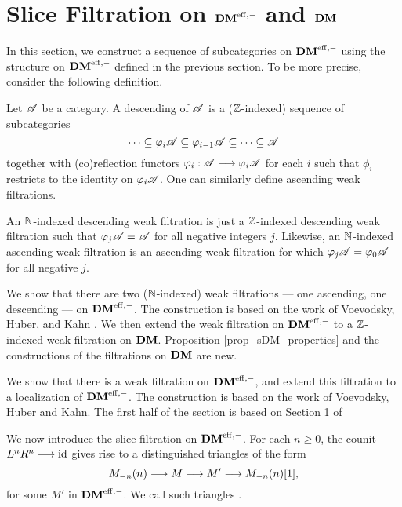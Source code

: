 \newpage
\chapter{Slice Filtration on $\DMeff$ and $\DM$}\label{sect_slice_filt_dm}

In this section, we construct a sequence of subcategories on 
$\DMeff$ using the structure on $\DMeff$ defined in the previous
section. To be more precise, consider the following definition.

\begin{defn}\label{def_cat_filtration}
Let $\Cat{A}$ be a category. A descending  of 
$\Cat{A}$ is a ($\Z$-indexed) sequence of subcategories
\[
\cdots \subseteq \phi_i\Cat{A} \subseteq \phi_{i - 1}\Cat{A} 
   \subseteq \cdots \subseteq \Cat{A}
\]
together with (co)reflection functors $\phi_i: \Cat{A} \to 
\phi_i\Cat{A}$ for each $i$ such that $\phi_i$ restricts to 
the identity on $\phi_i\Cat{A}$. One can similarly define
ascending weak filtrations.
\end{defn}

\begin{rmk}
An $\N$-indexed descending weak filtration is just a $\Z$-indexed 
descending weak filtration such that $\phi_{j}\Cat{A} = \Cat{A}$
for all negative integers $j$. Likewise, an $\N$-indexed ascending 
weak filtration is an ascending weak filtration for which
$\phi_{j}\Cat{A} = \phi_{0}\Cat{A}$ for all negative $j$.
\end{rmk}

We show that there are two ($\N$-indexed) weak filtrations --- 
one ascending, one descending --- on $\DMeff$. The construction 
is based on the work of Voevodsky, Huber, and Kahn \cite{HuKa}. 
We then extend the weak filtration on $\DMeff$ to a $\Z$-indexed
weak filtration on $\DM$. Proposition \ref{prop_sDM_properties}
and the constructions of the filtrations on $\DM$ are new.

We show that there is a weak filtration on $\DMeff$, and extend 
this filtration to a localization of $\DMeff$. The construction
is based on the work of Voevodsky, Huber and Kahn. The first half
of the section is based on Section 1 of \cite{HuKa}

We now introduce the slice filtration on $\DMeff$. For each 
$n \geq 0$, the counit $\LDMf{n}\RDMf{n} \to \id$ gives rise to a 
distinguished triangles of the form
\begin{equation}\label{eq_slice_triangle_1}
\tZ[n]{\hZ[n]{M}} \to M \to M' \to \tZ[n]{\hZ[n]{M}}[1],
\end{equation}
for some $M'$ in $\DMeff$. We call such triangles .

